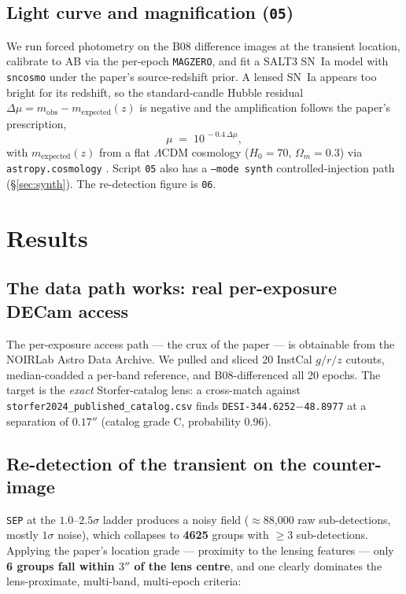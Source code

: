 \documentclass[11pt,letterpaper]{article}
\newcommand{\muamp}{\ensuremath{\mu}}
\begin{document}
\subsection{Light curve and magnification (\texttt{05})}
We run forced photometry on the B08 difference images at the transient
location, calibrate to AB via the per-epoch \texttt{MAGZERO}, and fit a
SALT3 \autocite{kenworthy2021salt3} SN~Ia model with \texttt{sncosmo}
\autocite{barbary2024sncosmo} under the paper's source-redshift prior. A
lensed SN~Ia appears too bright for its redshift, so the standard-candle
Hubble residual $\Delta\mu = m_{\mathrm{obs}} - m_{\mathrm{expected}}(z)$ is
negative and the amplification follows the paper's prescription,
\begin{equation}
\muamp \;=\; 10^{\,-0.4\,\Delta\mu} ,
\label{eq:mu}
\end{equation}
with $m_{\mathrm{expected}}(z)$ from a flat $\Lambda$CDM cosmology
($H_0=70$, $\Omega_m=0.3$) via \texttt{astropy.cosmology}
\autocite{astropy2022}. Script \texttt{05} also has a \texttt{--mode synth}
controlled-injection path (\S\ref{sec:synth}). The re-detection figure is
\texttt{06}.

\section{Results}

\subsection{The data path works: real per-exposure DECam access}
The per-exposure access path --- the crux of the paper --- is obtainable
from the NOIRLab Astro Data Archive. We pulled and sliced 20 InstCal
$g/r/z$ cutouts, median-coadded a per-band reference, and B08-differenced
all 20 epochs. The target is the \emph{exact} Storfer-catalog lens: a
cross-match against \texttt{storfer2024\_published\_catalog.csv} finds
\texttt{DESI-344.6252$-$48.8977} at a separation of \textbf{$0.17''$}
(catalog grade C, probability 0.96).

\subsection{Re-detection of the transient on the counter-image}
\texttt{SEP} at the $1.0$--$2.5\sigma$ ladder produces a noisy field
($\approx$88{,}000 raw sub-detections, mostly $1\sigma$ noise), which
collapses to \textbf{4625} groups with $\geq3$ sub-detections. Applying the
paper's location grade --- proximity to the lensing features --- only
\textbf{6 groups fall within $3''$ of the lens centre}, and one clearly
dominates the lens-proximate, multi-band, multi-epoch criteria:
\end{document}
